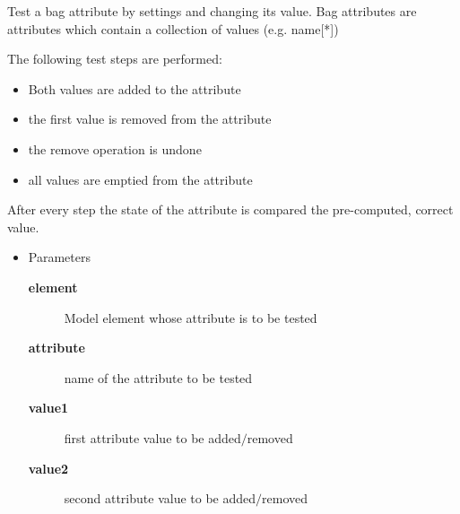 \begin{desc}Test a bag attribute by settings and changing its value.
 Bag attributes are attributes which contain a collection
 of values (e.g. name[*])

 The following test steps are performed:
 \begin{itemize}

   \item{   Both values are added to the attribute
   }
\item{   the first value is removed from the attribute
   }
\item{   the remove operation is undone
   }
\item{   all values are emptied from the attribute
 }
\end{itemize}


 After every step the state of the attribute is compared
 the pre-computed, correct value.
\begin{itemize}
\item{Parameters
  \begin{description}
   \item[{\bf element}]{Model element whose attribute is to be tested}
   \item[{\bf attribute}]{name of the attribute to be tested}
   \item[{\bf value1}]{first attribute value to be added$/$removed}
   \item[{\bf value2}]{second attribute value to be added$/$removed}
  \end{description}}
\end{itemize}
\end{desc}

